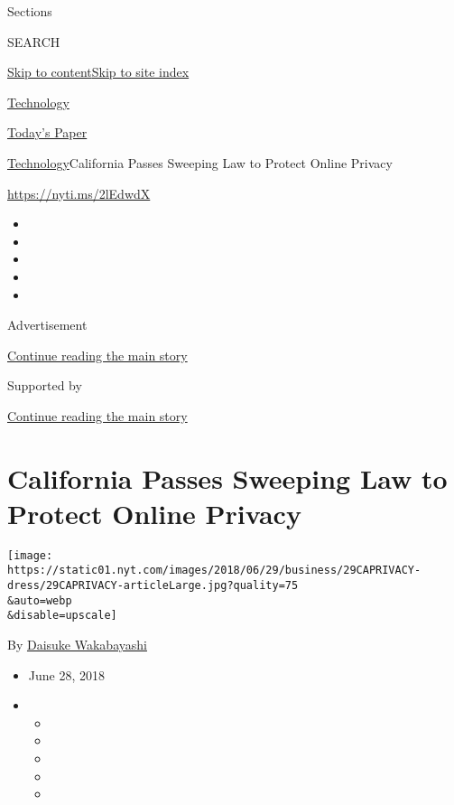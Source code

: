 Sections

SEARCH

\protect\hyperlink{site-content}{Skip to
content}\protect\hyperlink{site-index}{Skip to site index}

\href{https://www.nytimes.com/section/technology}{Technology}

\href{https://myaccount.nytimes.com/auth/login?response_type=cookie\&client_id=vi}{}

\href{https://www.nytimes.com/section/todayspaper}{Today's Paper}

\href{/section/technology}{Technology}\textbar{}California Passes
Sweeping Law to Protect Online Privacy

\url{https://nyti.ms/2lEdwdX}

\begin{itemize}
\item
\item
\item
\item
\item
\end{itemize}

Advertisement

\protect\hyperlink{after-top}{Continue reading the main story}

Supported by

\protect\hyperlink{after-sponsor}{Continue reading the main story}

\hypertarget{california-passes-sweeping-law-to-protect-online-privacy}{%
\section{California Passes Sweeping Law to Protect Online
Privacy}\label{california-passes-sweeping-law-to-protect-online-privacy}}

\texttt{[image: https://static01.nyt.com/images/2018/06/29/business/29CAPRIVACY-dress/29CAPRIVACY-articleLarge.jpg?quality=75\\\&auto=webp\\\&disable=upscale]}

By \href{https://www.nytimes.com/by/daisuke-wakabayashi}{Daisuke
Wakabayashi}

\begin{itemize}
\item
  June 28, 2018
\item
  \begin{itemize}
  \item
  \item
  \item
  \item
  \item
  \end{itemize}
\end{itemize}

